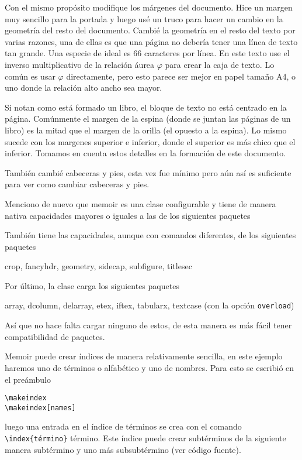 Con el mismo propósito modifique los márgenes del documento. Hice un margen
muy sencillo para la portada y luego usé un truco para hacer un cambio en
la geometría del resto del documento. Cambié la geometría en el resto del
texto por varias razones, una de ellas es que una página no debería tener
una línea de texto tan grande. Una especie de ideal es 66 caracteres por
línea. En este texto use el inverso multiplicativo de la relación áurea
\(\varphi \) para crear la caja de texto. Lo común es usar \(\varphi \)
directamente, pero esto parece ser mejor en papel tamaño A4, o uno donde
la relación alto ancho sea mayor.

Si notan como está formado un libro, el bloque de texto no está centrado
en la página. Comúnmente el margen de la espina (donde se juntan las
páginas de un libro) es la mitad que el margen de la orilla (el opuesto a
la espina). Lo mismo sucede con los margenes superior e inferior, donde el
superior es más chico que el inferior. Tomamos en cuenta estos detalles en
la formación de este documento.

También cambié cabeceras y pies, esta vez fue mínimo pero aún así es
suficiente para ver como cambiar cabeceras y pies.

Menciono de nuevo que memoir es una clase configurable y tiene de
manera nativa capacidades mayores o iguales a
las de los siguientes paquetes
\begin{center}
\end{center}
También tiene las capacidades, aunque con comandos diferentes, de los siguientes paquetes
\begin{center}
  crop, fancyhdr, geometry, sidecap, subfigure, titlesec
\end{center}
Por último, la clase carga los siguientes paquetes
\begin{center}
  array, dcolumn, delarray, etex, iftex, tabularx, textcase (con la opción \texttt{overload})
\end{center}
Así que no hace falta cargar ninguno de estos, de esta manera es más fácil
tener compatibilidad de paquetes.

Memoir puede crear índices de manera relativamente sencilla, en este ejemplo
haremos uno de términos o alfabético y uno de nombres. Para esto se escribió
en el preámbulo
\begin{flushleft}
  \verb|\makeindex|\\
  \verb|\makeindex[names]|
\end{flushleft}
luego una entrada en el índice de términos se crea con el comando
\verb|\index{término}| término. Este índice puede crear
subtérminos de la siguiente manera subtérmino y
uno más subsubtérmino (ver código
fuente).

